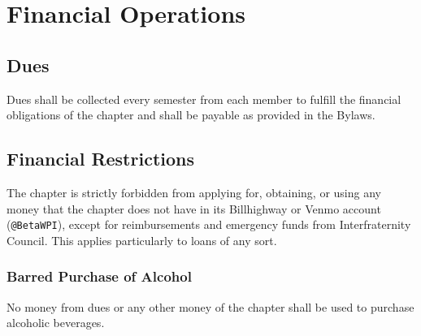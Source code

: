 \chapter{Financial Operations}
\label{cha:financial-operations}

\section{Dues}
\label{sec:dues}

Dues shall be collected every semester from each member to fulfill the financial
obligations of the chapter and shall be payable as provided in the Bylaws.

\section{Financial Restrictions}
\label{sec:financial-restrictions}

The chapter is strictly forbidden from applying for, obtaining, or using any
money that the chapter does not have in its Billhighway or Venmo account
(\texttt{@BetaWPI}), except for reimbursements and emergency funds from
Interfraternity Council.
This applies particularly to loans of any sort.

\subsection{Barred Purchase of Alcohol}
\label{sec:barred-purchase-of-alcohol}

No money from dues or any other money of the chapter shall be used to purchase
alcoholic beverages.
